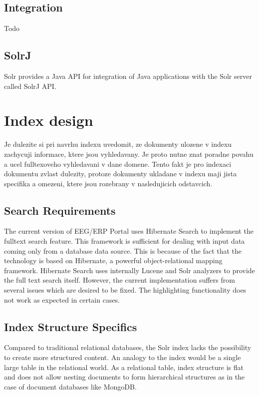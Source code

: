 \documentclass[12pt, oneside, a4paper]{book}
\begin{document}
\section{Integration}

Todo


\section{SolrJ}

Solr provides a Java API for integration of Java applications with the Solr server called SolrJ API.


\chapter{Index design}

Je dulezite si pri navrhu indexu uvedomit, ze dokumenty
ulozene v indexu zachycuji informace, ktere jsou vyhledavany. Je proto
nutne znat poradne povahu a ucel fulltexoveho vyhledavani
v dane domene. Tento fakt je pro indexaci dokumentu zvlast
dulezity, protoze dokumenty ukladane v indexu maji jista specifika
a omezeni, ktere jsou rozebrany v nasledujicich odstavcich.


\section{Search Requirements}

The current version of EEG/ERP Portal uses Hibernate Search to implement
the fulltext search feature. This framework is sufficient for dealing
with input data coming only from a database data source. This is because
of the fact that the technology is based on Hibernate, a powerful
object-relational mapping framework. Hibernate Search uses internally
Lucene and Solr analyzers to provide the full text search itself.
However, the current implementation suffers from several issues which
are desired to be fixed. The highlighting functionality does not work
as expected in certain cases. 


\section{Index Structure Specifics}

Compared to traditional relational databases, the Solr index lacks
the possibility to create more structured content. An analogy to the
index would be a single large table in the relational world. As a
relational table, index structure is flat and does not allow nesting
documents to form hierarchical structures as in the case of document
databases like MongoDB.
\end{document}
